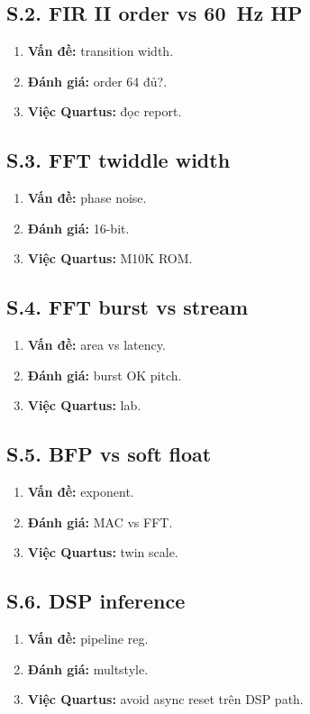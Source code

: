 \subsection*{S.2. FIR II order vs 60~Hz HP}
\begin{enumerate}\setlength{\itemsep}{2pt}
\item \textbf{Vấn đề:} transition width.
\item \textbf{Đánh giá:} order 64 đủ?.
\item \textbf{Việc Quartus:} đọc report.
\end{enumerate}
\subsection*{S.3. FFT twiddle width}
\begin{enumerate}\setlength{\itemsep}{2pt}
\item \textbf{Vấn đề:} phase noise.
\item \textbf{Đánh giá:} 16-bit.
\item \textbf{Việc Quartus:} M10K ROM.
\end{enumerate}
\subsection*{S.4. FFT burst vs stream}
\begin{enumerate}\setlength{\itemsep}{2pt}
\item \textbf{Vấn đề:} area vs latency.
\item \textbf{Đánh giá:} burst OK pitch.
\item \textbf{Việc Quartus:} lab.
\end{enumerate}
\subsection*{S.5. BFP vs soft float}
\begin{enumerate}\setlength{\itemsep}{2pt}
\item \textbf{Vấn đề:} exponent.
\item \textbf{Đánh giá:} MAC vs FFT.
\item \textbf{Việc Quartus:} twin scale.
\end{enumerate}
\subsection*{S.6. DSP inference}
\begin{enumerate}\setlength{\itemsep}{2pt}
\item \textbf{Vấn đề:} pipeline reg.
\item \textbf{Đánh giá:} multstyle.
\item \textbf{Việc Quartus:} avoid async reset trên DSP path.
\end{enumerate}
